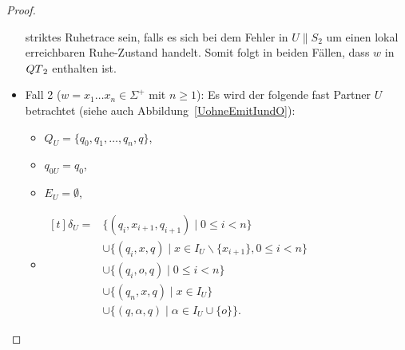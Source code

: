 \begin{proof}
\begin{itemize}
      striktes Ruhetrace sein, falls es sich bei dem Fehler in $U\|S_2$ um
      einen lokal erreichbaren Ruhe-Zustand handelt. Somit folgt in beiden
      Fällen, dass $w$ in $QT{}_2$ enthalten ist.
    \item Fall 2 ($w=x_1\dots x_n\in \Sigma ^+$ mit $n\geq 1$): Es wird der
      folgende fast Partner $U$ betrachtet (siehe auch
      Abbildung~\ref{UohneEmitIundO}):
      \begin{itemize}
        \item $Q_U=\{q_0,q_1,\dots ,q_n, q\}$,
        \item $q_{0U}=q_0$,
        \item $E_U=\emptyset$,
        \item $\begin{aligned}[t]
            \delta _U=&\{(q_i,x_{i+1},q_{i+1})\mid  0\leq i< n\}\\
                      &\cup\{(q_i,x,q)\mid  x\in I_U\backslash\{x_{i+1}\}, 0\leq i< n\}\\
                      &\cup\{(q_i,o,q)\mid 0\leq i< n\}\\
                      &\cup\{(q_n,x,q)\mid x\in I_U\}\\
                      &\cup\{(q,\alpha,q)\mid \alpha\in I_U\cup\{o\}\}.
        \end{aligned}$
      \end{itemize}
      \begin{figure} [h!tbp]
      \begin{center}
\end{center}
\end{figure}
\end{itemize}
\end{proof}
